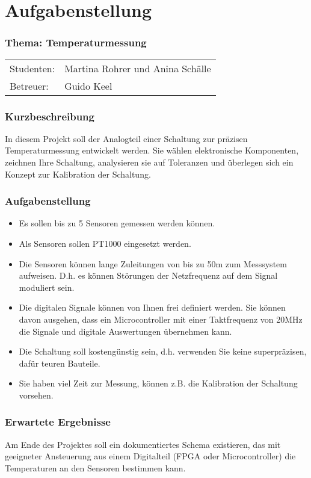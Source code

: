 \chapter{Aufgabenstellung}
\label{chp:aufgabenstellung}

\subsection*{Thema:	Temperaturmessung}
\begin{tabular}{ll}
Studenten: & 	Martina Rohrer und Anina Schälle\\ 
Betreuer: & 	Guido Keel \\ 
\end{tabular}

\subsection*{Kurzbeschreibung}
In diesem Projekt soll der Analogteil einer Schaltung zur präzisen Temperaturmessung entwickelt werden. Sie wählen elektronische Komponenten, zeichnen Ihre Schaltung, analysieren sie auf Toleranzen und überlegen sich ein Konzept zur Kalibration der Schaltung. 


\subsection*{Aufgabenstellung}
\begin{itemize}
	\item  Es sollen bis zu 5 Sensoren gemessen werden können.
	\item Als Sensoren sollen PT1000 eingesetzt werden.
	\item  Die Sensoren können lange Zuleitungen von bis zu 50m zum Messsystem aufweisen. D.h. es können Störungen der Netzfrequenz auf dem Signal moduliert sein.
	\item Die digitalen Signale können von Ihnen frei definiert werden. Sie können davon ausgehen, dass ein Microcontroller mit einer Taktfrequenz von 20MHz die Signale und digitale Auswertungen übernehmen kann.
	\item Die Schaltung soll kostengünstig sein, d.h. verwenden Sie keine
	superpräzisen, dafür teuren Bauteile.
	\item Sie haben viel Zeit zur Messung, können z.B. die Kalibration der
	Schaltung vorsehen.
\end{itemize}

\subsection*{Erwartete Ergebnisse}
Am Ende des Projektes soll ein dokumentiertes Schema existieren, das mit
geeigneter Ansteuerung aus einem Digitalteil (FPGA oder Microcontroller) die Temperaturen an den Sensoren bestimmen kann.



